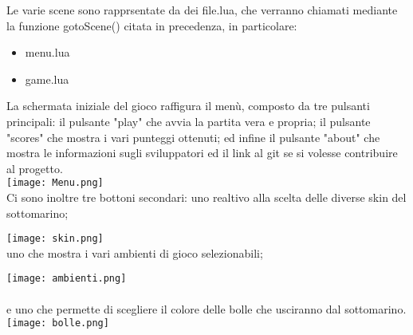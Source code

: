 \documentclass[12pt]{article}
\begin{document}
Le varie scene sono rapprsentate da dei file.lua, che verranno chiamati mediante la funzione gotoScene() citata in precedenza, in particolare:
\begin{itemize}
    \item menu.lua
    \item game.lua
\end{itemize}



La schermata iniziale del gioco raffigura il menù, composto da tre pulsanti principali: il pulsante "play" che avvia la partita vera e propria; il pulsante "scores" che mostra i vari punteggi ottenuti; ed infine il pulsante "about" che mostra le informazioni sugli sviluppatori ed il link al git se si volesse contribuire al progetto. \\

\texttt{[image: Menu.png]}\\
Ci sono inoltre tre bottoni secondari: uno realtivo alla scelta delle diverse skin del sottomarino; 

\texttt{[image: skin.png]}\\

uno che mostra i vari ambienti di gioco selezionabili; 

\texttt{[image: ambienti.png]}\\
\\
e uno che permette di scegliere il colore delle bolle che usciranno dal sottomarino. 
\\

\texttt{[image: bolle.png]}\\
\end{document}
